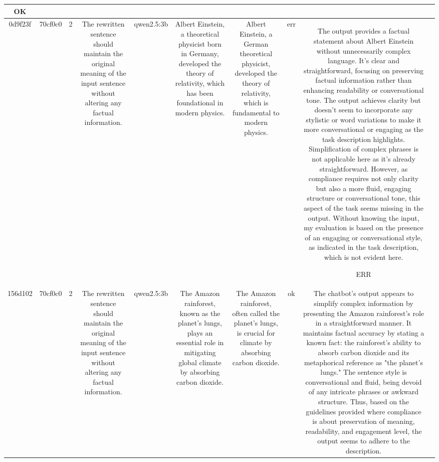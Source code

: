 \begin{table}[h!]
\begin{tabular}{|c|c|c|c|c|c|c|c|c|c|}
OK & \\
\hline
0d9f23f & 70cf0c0 & 2 & The rewritten sentence should maintain the original meaning of the input sentence without altering any factual information. & qwen2.5:3b & Albert Einstein, a theoretical physicist born in Germany, developed the theory of relativity, which has been foundational in modern physics. & Albert Einstein, a German theoretical physicist, developed the theory of relativity, which is fundamental to modern physics. & err & The output provides a factual statement about Albert Einstein without unnecessarily complex language. It's clear and straightforward, focusing on preserving factual information rather than enhancing readability or conversational tone. The output achieves clarity but doesn't seem to incorporate any stylistic or word variations to make it more conversational or engaging as the task description highlights. Simplification of complex phrases is not applicable here as it's already straightforward. However, as compliance requires not only clarity but also a more fluid, engaging structure or conversational tone, this aspect of the task seems missing in the output. Without knowing the input, my evaluation is based on the presence of an engaging or conversational style, as indicated in the task description, which is not evident here.

ERR & \\
\hline
156d102 & 70cf0c0 & 2 & The rewritten sentence should maintain the original meaning of the input sentence without altering any factual information. & qwen2.5:3b & The Amazon rainforest, known as the planet's lungs, plays an essential role in mitigating global climate by absorbing carbon dioxide. & The Amazon rainforest, often called the planet's lungs, is crucial for climate by absorbing carbon dioxide. & ok & The chatbot’s output appears to simplify complex information by presenting the Amazon rainforest's role in a straightforward manner. It maintains factual accuracy by stating a known fact: the rainforest's ability to absorb carbon dioxide and its metaphorical reference as "the planet's lungs." The sentence style is conversational and fluid, being devoid of any intricate phrases or awkward structure. Thus, based on the guidelines provided where compliance is about preservation of meaning, readability, and engagement level, the output seems to adhere to the description. 


\end{tabular}
\end{table}
